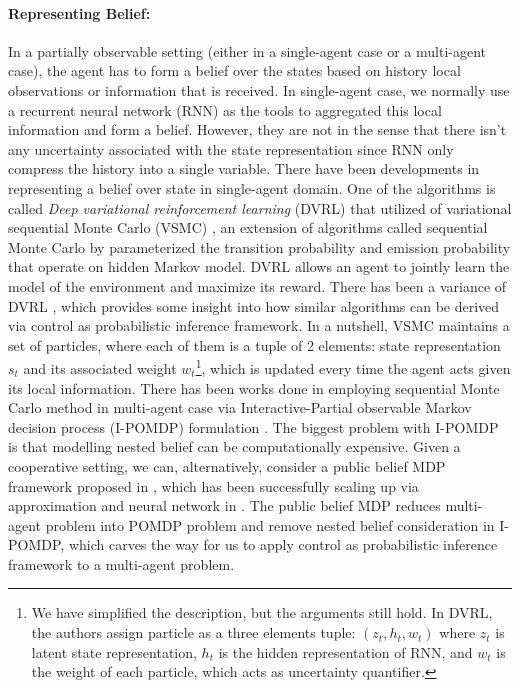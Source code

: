\paragraph{Representing Belief:} In a partially observable setting (either in a single-agent case or a multi-agent case), the agent has to form a belief over the states based on history local observations or information that is received. In single-agent case, we normally use a recurrent neural network (RNN) as the tools to aggregated this local information and form a belief. However, they are not  in the sense that there isn't any uncertainty associated with the state representation since RNN only compress the history into a single variable. There have been developments in representing a belief over state in single-agent domain. One of the algorithms is called \textit{Deep variational reinforcement learning} (DVRL) \cite{igl2018deep} that utilized of variational sequential Monte Carlo (VSMC) \cite{le2017auto, maddison2017filtering, naesseth2017variational}, an extension of algorithms called sequential Monte Carlo \cite{doucet2001introduction} by parameterized the transition probability and emission probability that operate on hidden Markov model. DVRL allows an agent to jointly learn the model of the environment and maximize its reward. There has been a variance of DVRL \cite{shvechikovjoint}, which provides some insight into how similar algorithms can be derived via control as probabilistic inference framework. In a nutshell, VSMC maintains a set of particles, where each of them is a tuple of 2 elements: state representation $s_t$ and its associated weight $w_t$\footnote{We have simplified the description, but the arguments still hold. In DVRL, the authors assign particle as a three elements tuple: $(z_t, h_t, w_t)$ where $z_t$ is latent state representation, $h_t$ is the hidden representation of RNN, and $w_t$ is the weight of each particle, which acts as uncertainty quantifier.}, which is updated every time the agent acts given its local information. There has been works done in employing sequential Monte Carlo method in multi-agent case \cite{doshi2009monte} via Interactive-Partial observable Markov decision process (I-POMDP) formulation \cite{gmytrasiewicz2005framework}. The biggest problem with I-POMDP is that modelling nested belief can be computationally expensive. Given a cooperative setting, we can, alternatively, consider a public belief MDP framework proposed in \cite{nayyar2013decentralized}, which has been successfully scaling up via approximation and neural network in \cite{foerster2018bayesian, hu2019simplified}. The public belief MDP reduces multi-agent problem into POMDP problem and remove nested belief consideration in I-POMDP, which carves the way for us to apply control as probabilistic inference framework to a multi-agent problem. 


